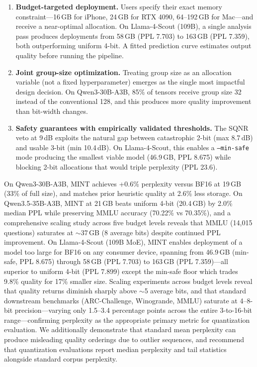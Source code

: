 \documentclass{article}
\begin{document}
\begin{enumerate}
    \item \textbf{Budget-targeted deployment.} Users specify their exact memory constraint---16\,GB for iPhone, 24\,GB for RTX 4090, 64--192\,GB for Mac---and receive a near-optimal allocation. On Llama-4-Scout (109B), a single analysis pass produces deployments from 58\,GB (PPL 7.703) to 163\,GB (PPL 7.359), both outperforming uniform 4-bit. A fitted prediction curve estimates output quality before running the pipeline.
    \item \textbf{Joint group-size optimization.} Treating group size as an allocation variable (not a fixed hyperparameter) emerges as the single most impactful design decision. On Qwen3-30B-A3B, 85\% of tensors receive group size 32 instead of the conventional 128, and this produces more quality improvement than bit-width changes.
    \item \textbf{Safety guarantees with empirically validated thresholds.} The SQNR veto at 9\,dB exploits the natural gap between catastrophic 2-bit (max 8.7\,dB) and usable 3-bit (min 10.4\,dB). On Llama-4-Scout, this enables a \texttt{--min-safe} mode producing the smallest viable model (46.9\,GB, PPL 8.675) while blocking 2-bit allocations that would triple perplexity (PPL 23.6).
\end{enumerate}

On Qwen3-30B-A3B, MINT achieves +0.6\% perplexity versus BF16 at 19\,GB (33\% of full size), and matches prior heuristic quality at 2.6\% less storage. On Qwen3.5-35B-A3B, MINT at 21\,GB beats uniform 4-bit (20.4\,GB) by 2.0\% median PPL while preserving MMLU accuracy (70.22\% vs 70.35\%), and a comprehensive scaling study across five budget levels reveals that MMLU (14{,}015 questions) saturates at ${\sim}$37\,GB (8 average bits) despite continued PPL improvement. On Llama-4-Scout (109B MoE), MINT enables deployment of a model too large for BF16 on any consumer device, spanning from 46.9\,GB (min-safe, PPL 8.675) through 58\,GB (PPL 7.703) to 163\,GB (PPL 7.359)---all superior to uniform 4-bit (PPL 7.899) except the min-safe floor which trades 9.8\% quality for 17\% smaller size. Scaling experiments across budget levels reveal that quality returns diminish sharply above ${\sim}$5 average bits, and that standard downstream benchmarks (ARC-Challenge, Winogrande, MMLU) saturate at 4--8-bit precision---varying only 1.5--3.4 percentage points across the entire 3-to-16-bit range---confirming perplexity as the appropriate primary metric for quantization evaluation. We additionally demonstrate that standard mean perplexity can produce misleading quality orderings due to outlier sequences, and recommend that quantization evaluations report median perplexity and tail statistics alongside standard corpus perplexity.
\end{document}
